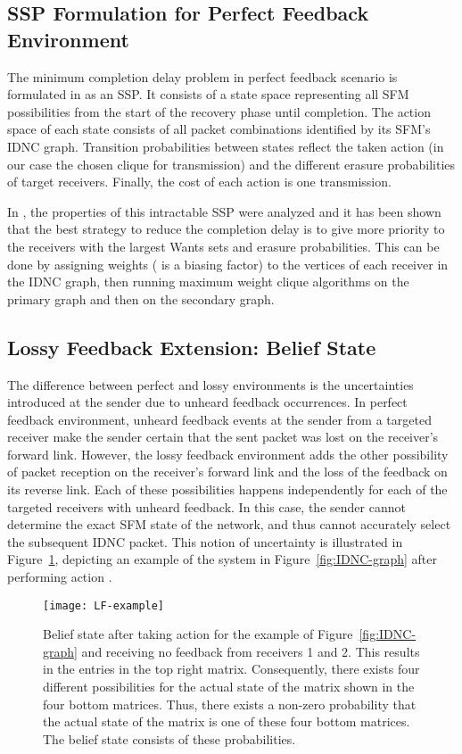 \documentclass[10pt,jounral]{IEEEtran}
\newcommand{\fref}[1]{Figure~\ref{#1}}
\begin{document}
\subsection{SSP Formulation for Perfect Feedback Environment}\label{sec:perfect-formulation}
The minimum completion delay problem in perfect feedback scenario is formulated in \cite{ICC10,TON10-CD} as an SSP. It consists of a state space  representing all SFM possibilities from the start of the recovery phase until completion. The action space of each state consists of all packet combinations identified by its SFM's IDNC graph. Transition probabilities between states reflect the taken action (in our case the chosen clique for transmission) and the different erasure probabilities of target receivers. Finally, the cost of each action is one transmission.

In \cite{TON10-CD}, the properties of this intractable SSP were analyzed and it has been shown that the best strategy to reduce the completion delay is to give more priority to the receivers with the largest Wants sets and erasure probabilities. This can be done by assigning weights  ( is a biasing factor) to the vertices of each receiver  in the IDNC graph, then running maximum weight clique algorithms on the primary graph and then on the secondary graph.


\subsection{Lossy Feedback Extension: Belief State}\label{sec:lossy-formulation}
The difference between perfect and lossy environments is the uncertainties introduced at the sender due to unheard feedback occurrences. In perfect feedback environment, unheard feedback events at the sender from a targeted receiver make the sender certain that the sent packet was lost on the receiver's forward link. However, the lossy feedback environment adds the other possibility of packet reception on the receiver's forward link and the loss of the feedback on its reverse link. Each of these possibilities happens independently for each of the targeted receivers with unheard feedback. In this case, the sender cannot determine the exact SFM state of the network, and thus cannot accurately select the subsequent IDNC packet. This notion of uncertainty is illustrated in \fref{fig:LF-example}, depicting an example of the system in \fref{fig:IDNC-graph} after performing action .

\begin{figure}[t]
\centering
  \texttt{[image: LF-example]}
    \caption{Belief state after taking action  for the example of \fref{fig:IDNC-graph} and receiving no feedback from receivers 1 and 2. This results in the  entries in the top right matrix. Consequently, there exists four different possibilities for the actual state of the matrix shown in the four bottom matrices. Thus, there exists a non-zero probability that the actual state of the matrix is one of these four bottom matrices. The belief state consists of these probabilities.}\label{fig:LF-example}
\end{figure}
\end{document}
